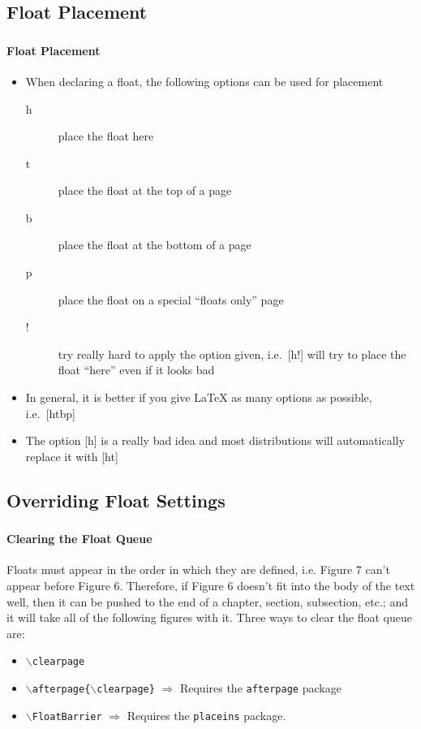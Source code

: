 \documentclass[article]{beamer}
\begin{document}
\subsection{Float Placement}
\begin{frame}
  \frametitle{\thesubsection}
  \framesubtitle{Float Placement}
  \begin{itemize}%
    \item When declaring a float, the following options can be used for
      placement
  \begin{description}
    \item[h] place the float here
    \item[t] place the float at the top of a page
    \item[b] place the float at the bottom of a page
    \item[p] place the float on a special ``floats only'' page
    \item[!] try really hard to apply the option given, i.e.~[h!] will try to
      place the float ``here'' even if it looks bad
  \end{description}
    \item In general, it is better if you give \LaTeX{} as many options as possible,
        i.e.~[htbp]
    \item The option [h] is a really bad idea and most distributions will
      automatically replace it with [ht]
  \end{itemize}

\end{frame}


\subsection{Overriding Float Settings}
\begin{frame}
  \frametitle{\thesubsection}
  \framesubtitle{Clearing the Float Queue}
  Floats must appear in the order in which they are defined, i.e. Figure 7
  can't appear before Figure 6.  Therefore, if Figure 6 doesn't fit into the
  body of the text well, then it can be pushed to the end of a chapter,
  section, subsection, etc.; and it will take all of the following figures
  with it.  Three ways to clear the float queue are:
  \begin{itemize}%
    \item \texttt{$\backslash$clearpage}
    \item \texttt{$\backslash$afterpage\{$\backslash$clearpage\}} \(\Rightarrow\)
      Requires the \texttt{afterpage} package
    \item \texttt{$\backslash$FloatBarrier} \(\Rightarrow\) Requires the
      \texttt{placeins} package.  
  \end{itemize}
\end{frame}
\end{document}
